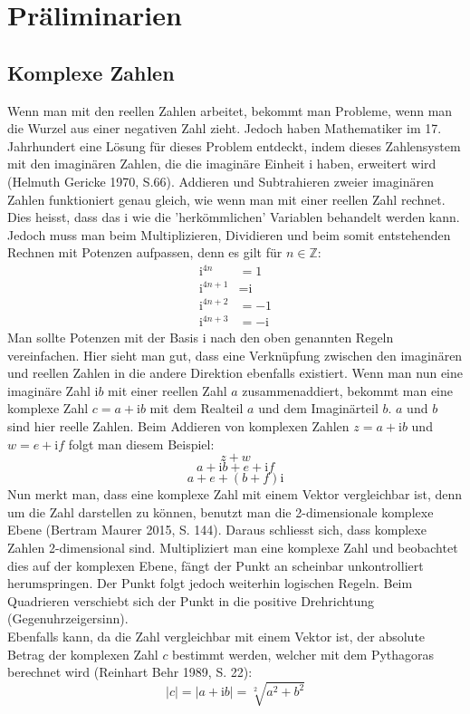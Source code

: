 \section{Präliminarien}
\subsection{Komplexe Zahlen}
Wenn man mit den reellen Zahlen arbeitet, bekommt man Probleme, wenn man die Wurzel aus einer negativen Zahl zieht. Jedoch haben Mathematiker im 17. Jahrhundert eine Lösung für dieses Problem entdeckt, indem dieses Zahlensystem mit den imaginären Zahlen, die die imaginäre Einheit i haben, erweitert wird (Helmuth Gericke 1970, S.66). Addieren und Subtrahieren zweier imaginären Zahlen funktioniert genau gleich, wie wenn man mit einer reellen Zahl rechnet. Dies heisst, dass das i wie die 'herkömmlichen' Variablen behandelt werden kann. Jedoch muss man beim Multiplizieren, Dividieren und beim somit entstehenden Rechnen mit Potenzen aufpassen, denn es gilt für $n \in \mathbb{Z}$:
\begin{align*}
\text{i}^{4n} &= 1 \\
\text{i}^{4n+1} &= \text{i} \\
\text{i}^{4n+2} &= -1 \\
\text{i}^{4n+3} &= -\text{i}
\end{align*}
Man sollte Potenzen mit der Basis i nach den oben genannten Regeln vereinfachen. Hier sieht man gut, dass eine Verknüpfung zwischen den imaginären und reellen Zahlen in die andere Direktion ebenfalls existiert. Wenn man nun eine imaginäre Zahl $\text{i}b$ mit einer reellen Zahl $a$ zusammenaddiert, bekommt man eine komplexe Zahl  $c=a+\text{i}b$ mit dem Realteil $a$ und dem Imaginärteil $b$. $a$ und $b$ sind hier reelle Zahlen. Beim Addieren von komplexen Zahlen $z=a+\text{i}b$ und $w=e+\text{i}f$ folgt man diesem Beispiel:
\[z+w\]
\[a+\text{i}b+e+\text{i}f\]
\[a+e+(b+f)\text{i}\]
Nun merkt man, dass eine komplexe Zahl mit einem Vektor vergleichbar ist, denn um die Zahl darstellen zu können, benutzt man die 2-dimensionale komplexe Ebene (Bertram Maurer 2015, S. 144). Daraus schliesst sich, dass komplexe Zahlen 2-dimensional sind. Multipliziert man eine komplexe Zahl und beobachtet dies auf der komplexen Ebene, fängt der Punkt an scheinbar unkontrolliert herumspringen. Der Punkt folgt jedoch weiterhin logischen Regeln. Beim Quadrieren verschiebt sich der Punkt in die positive Drehrichtung (Gegenuhrzeigersinn).
\\
Ebenfalls kann, da die Zahl vergleichbar mit einem Vektor ist, der absolute Betrag der komplexen Zahl $c$ bestimmt werden, welcher mit dem Pythagoras berechnet wird (Reinhart Behr 1989, S. 22):
\[|c| = |a+\text{i}b| = \sqrt[2]{a^2+b^2}\]

